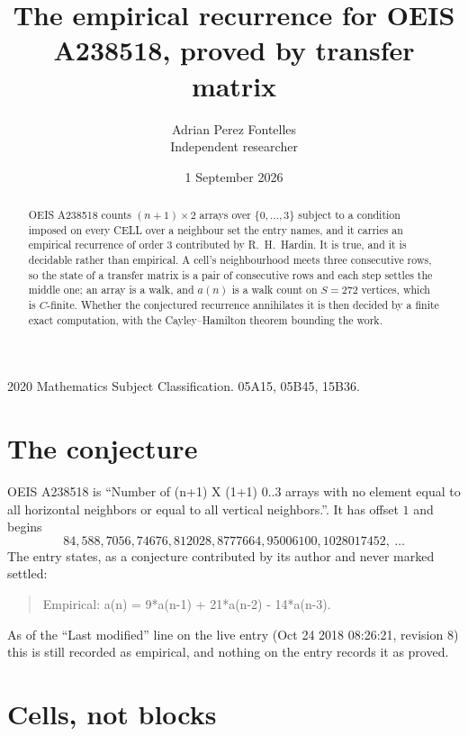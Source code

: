 \documentclass[11pt,a4paper]{article}
\title{The empirical recurrence for OEIS A238518, proved by transfer matrix}
\author{Adrian Perez Fontelles\\ \small Independent researcher}
\date{1 September 2026}
\theoremstyle{plain}
\theoremstyle{definition}
\begin{document}
\maketitle

\begin{abstract}
OEIS A238518 counts $(n+1)\times2$ arrays over $\{0,\dots,3\}$ subject to a condition imposed on
every CELL over a neighbour set the entry names, and it carries an empirical recurrence of
order $3$ contributed by R.~H.~Hardin. It is true, and it is decidable rather than
empirical. A cell's neighbourhood meets three consecutive rows, so the state of a transfer
matrix is a pair of consecutive rows and each step settles the middle one; an array is a
walk, and $a(n)$ is a walk count on $S=272$ vertices, which is $C$-finite. Whether the
conjectured recurrence annihilates it is then decided by a finite exact computation, with the
Cayley--Hamilton theorem bounding the work.
\end{abstract}

\noindent\small 2020 Mathematics Subject Classification. 05A15, 05B45, 15B36.\normalsize

\section{The conjecture}

OEIS A238518 is ``Number of (n+1) X (1+1) 0..3 arrays with no element equal to all horizontal neighbors or equal to all vertical neighbors.''. It has offset $1$ and begins
\[
84, 588, 7056, 74676, 812028, 8777664, 95006100, 1028017452,\ \dots
\]
The entry states, as a conjecture contributed by its author and never marked settled:
\begin{quote}
Empirical: a(n) = 9*a(n-1) + 21*a(n-2) - 14*a(n-3).
\end{quote}
As of the ``Last modified'' line on the live entry (Oct 24 2018 08:26:21, revision 8) this is still
recorded as empirical, and nothing on the entry records it as proved.

\section{Cells, not blocks}
\end{document}
